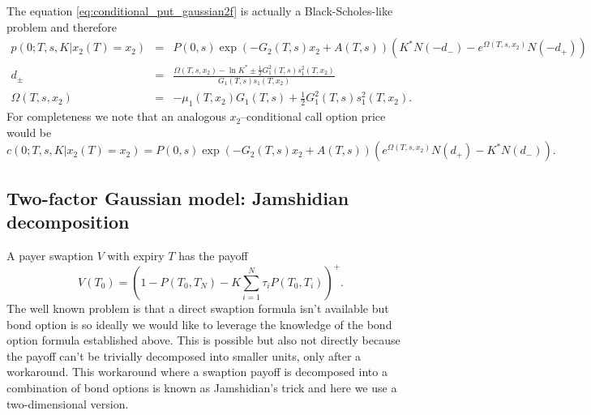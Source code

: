 \documentclass[11pt,a4paper]{article}
\theoremstyle{break} %
\numberwithin{equation}{section}
\begin{document}
The equation \eqref{eq:conditional_put_gaussian2f} is actually a Black-Scholes-like problem and therefore
\begin{eqnarray*}
p(0;T,s,K|{x_2}(T) = {x_2}) &=& P(0,s)\exp \left( { - {G_2}(T,s){x_2} + A(T,s)} \right)\left( {{K^*}N( - {d_ - }) - {e^{\Omega (T,s,{x_2})}}N( - {d_ + })} \right)\\
{d_ \pm } &=& \frac{{\Omega (T,s,{x_2}) - \ln {K^*} \pm \frac{1}{2}G_1^2(T,s)s_1^2(T,{x_2})}}{{{G_1}(T,s){s_1}(T,{x_2})}}\\
\Omega (T,s,{x_2}) &=&  - {\mu _1}(T,{x_2}){G_1}(T,s) + \frac{1}{2}G_1^2(T,s)s_1^2(T,{x_2}).
\end{eqnarray*}
For completeness we note that an analogous $x_2$--conditional call option price would be
\begin{equation*}
  c(0;T,s,K|{x_2}(T) = {x_2}) = P(0,s)\exp \left( { - {G_2}(T,s){x_2} + A(T,s)} \right)\left( {{e^{\Omega (T,s,{x_2})}}N({d_ + }) - {K^*}N({d_ - })} \right).
\end{equation*}
\subsection{Two-factor Gaussian model: Jamshidian decomposition}
A payer swaption $V$ with expiry $T$ has the payoff 
\begin{equation*}
  V({T_0}) = {\left( {1 - P({T_0},{T_N}) - K\sum\limits_{i = 1}^N {{\tau _i}P({T_0},{T_i})} } \right)^ + }.
\end{equation*}
The well known problem is that a direct swaption formula isn't available but bond option is so ideally we would like to leverage the knowledge of the bond option formula established above. This is possible but also not directly because the payoff can't be trivially decomposed into smaller units, only after a workaround. This workaround where a swaption payoff is decomposed into a combination of bond options is known as Jamshidian's trick and here we use a two-dimensional version.
\end{document}
